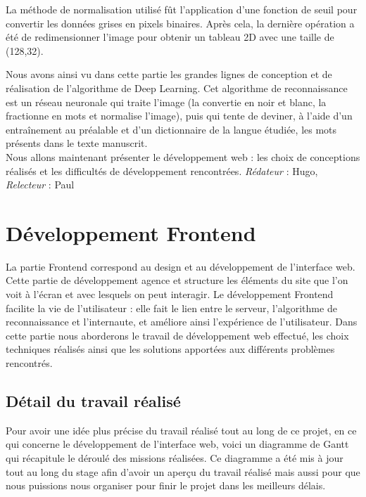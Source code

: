\documentclass[oneside,a4paper,13pt]{article}
\begin{document}
La méthode de normalisation utilisé fût l'application d'une fonction de seuil pour convertir les données grises en pixels binaires.
Après cela, la dernière opération a été de redimensionner l'image pour obtenir un tableau 2D avec une taille de (128,32).

\bigbreak
Nous avons ainsi vu dans cette partie les grandes lignes de conception et de réalisation de l'algorithme de Deep Learning. Cet algorithme de reconnaissance est un réseau neuronale qui traite l'image (la convertie en noir et blanc, la fractionne en mots et normalise l'image), puis qui tente de deviner, à l'aide d'un entraînement au préalable et d'un dictionnaire de la langue étudiée, les mots présents dans le texte manuscrit. \\
Nous allons maintenant présenter le développement web : les choix de conceptions réalisés et les difficultés de développement rencontrées. 
\smallbreak\textit{Rédateur} : Hugo, \textit{Relecteur} : Paul


\section{Développement Frontend}

La partie Frontend correspond au design et au développement de l’interface web. Cette partie de développement agence et structure les éléments du site que l’on voit à l’écran et avec lesquels on peut interagir. Le développement Frontend facilite la vie de l’utilisateur : elle fait le lien entre le serveur, l’algorithme de reconnaissance et l’internaute, et améliore ainsi l’expérience de l’utilisateur. 
\smallbreak
Dans cette partie nous aborderons le travail de développement web effectué, les choix techniques réalisés ainsi que les solutions apportées aux différents problèmes rencontrés. 


\subsection{Détail du travail réalisé}
Pour avoir une idée plus précise du travail réalisé tout au long de ce projet, en ce qui concerne le développement de l’interface web, voici un diagramme de Gantt qui récapitule le déroulé des missions réalisées. Ce diagramme a été mis à jour tout au long du stage afin d’avoir un aperçu du travail réalisé mais aussi pour que nous puissions nous organiser pour finir le projet dans les meilleurs délais. 
\end{document}
